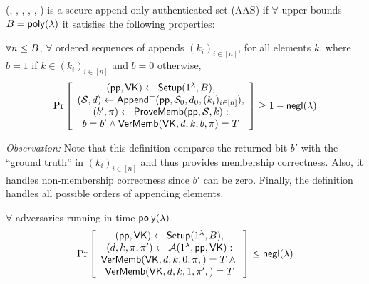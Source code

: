 \begin{definition}
    \label{def:secure-aas-definition}
    (\setup, \append, \provememb, \proveappendonly, \vermemb, \verappendonly) is a secure append-only authenticated set (AAS) if
    $\forall$ upper-bounds $B=\mathsf{poly}(\lambda)$ it satisfies the following properties:
\end{definition}

\begin{definition}
\label{def:aas:membership-correctness}
$\forall n \le B$, $\forall$ ordered sequences of appends $(k_i)_{i\in[n]}$, for all elements $k$, where $b=1$ if $k\in (k_i)_{i\in[n]}$ and $b=0$ otherwise,
\begin{align*}
\Pr \left[ \begin{array}{c}
(\pp,\vk) \leftarrow \setup(1^\lambda, \upperbound),\\
(\AS, d) \leftarrow \multiappend(\pp, \AS_0, d_0, (k_i)_{i\in[n]}),\\
(b',\pi) \leftarrow \provememb(\pp,\AS, k): \\
{{b=b'}\wedge{\vermemb(\vk, d, k, b, \pi) = T}}
\end{array} \right]
\ge 1 - \negl(\lambda)
\end{align*}
\end{definition}

\noindent \textit{Observation:}
Note that this definition compares the returned bit $b'$ with the ``ground truth'' in $(k_i)_{i\in[n]}$ and thus provides membership correctness.
Also, it handles non-membership correctness since $b'$ can be zero.
Finally, the definition handles all possible orders of appending elements.


\begin{definition}
\label{def:aas:membership-security}
$\forall$ adversaries \Adv running in time $\mathsf{poly}(\lambda)$,
\begin{align*}
\Pr \left[ \begin{array}{c}
(\mathsf{pp},\mathsf{VK}) \leftarrow \mathsf{Setup}(1^\lambda, B), \\
(d, k,\pi,\pi') \leftarrow \mathcal{A}(1^\lambda, \mathsf{pp}, \mathsf{VK})
: \\
{\mathsf{VerMemb}(\mathsf{VK},d, k,0,\pi ,) = T} \wedge {} \\
{\mathsf{VerMemb}(\mathsf{VK},d, k,1,\pi',) = T}
\end{array} \right] \le \mathsf{negl}(\lambda)
\end{align*}
\end{definition}

